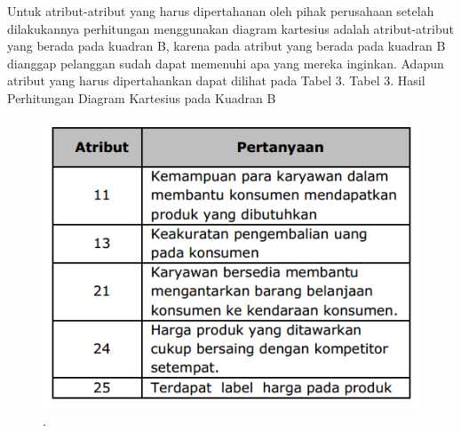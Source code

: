 Untuk atribut-atribut yang harus dipertahanan oleh pihak perusahaan setelah dilakukannya perhitungan menggunakan diagram kartesius adalah atribut-atribut
yang berada pada kuadran B, karena pada atribut yang berada pada kuadran B dianggap pelanggan sudah dapat memenuhi apa yang mereka inginkan. 
Adapun atribut yang harus dipertahankan dapat dilihat pada
Tabel 3.
Tabel 3. Hasil Perhitungan Diagram Kartesius
pada Kuadran B
\begin{figure}[ht]
	\centerline{\includegraphics[width=1\textwidth]{figures/rahmi6.PNG}}
	\caption{.}
	\label{rahmi6}
	\end{figure}

